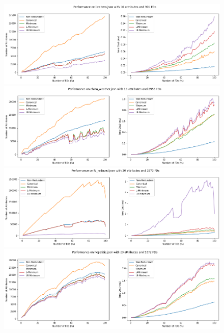 \documentclass[11pt]{book}
\begin{document}
\begin{figure}
	\centering
	\includegraphics[width=\textwidth]{./diagrams/lab1/lineitem.png}
	\includegraphics[width=\textwidth]{./diagrams/lab1/china_weather.png}
	\includegraphics[width=\textwidth]{./diagrams/lab1/fd_reduced.png}
	\includegraphics[width=\textwidth]{./diagrams/lab1/hepatitis.png}
\end{figure}
\end{document}
